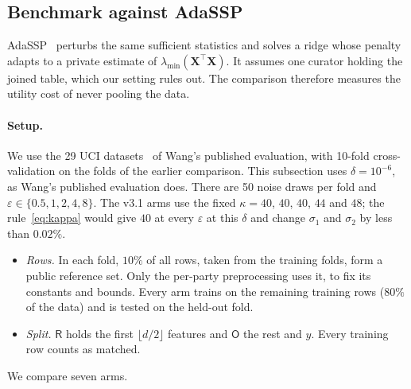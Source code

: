 \documentclass[11pt]{article}
\theoremstyle{definition}
\theoremstyle{plain}
\newcommand{\bX}{\mathbf{X}}
\newcommand{\Party}[1]{\textsf{#1}}
\newcommand{\Rp}{\Party{R}}
\newcommand{\Op}{\Party{O}}
\begin{document}
\subsection{Benchmark against AdaSSP}
\label{sec:eval:adassp}

AdaSSP~\cite{wang2018revisiting} perturbs the same sufficient statistics and solves a ridge whose penalty adapts to a private estimate of $\lambda_{\min}(\bX^{\top}\bX)$. It assumes one curator holding the joined table, which our setting rules out. The comparison therefore measures the utility cost of never pooling the data.

\paragraph{Setup.} We use the 29 UCI datasets~\cite{dua2019uci} of Wang's published evaluation, with 10-fold cross-validation on the folds of the earlier comparison. This subsection uses $\delta = 10^{-6}$, as Wang's published evaluation does. There are 50 noise draws per fold and $\varepsilon \in \{0.5, 1, 2, 4, 8\}$. The v3.1 arms use the fixed $\kappa = 40$, $40$, $40$, $44$ and $48$; the rule~\eqref{eq:kappa} would give $40$ at every $\varepsilon$ at this $\delta$ and change $\sigma_1$ and $\sigma_2$ by less than $0.02\%$.
\begin{itemize}[noitemsep]
  \item \emph{Rows.} In each fold, $10\%$ of all rows, taken from the training folds, form a public reference set. Only the per-party preprocessing uses it, to fix its constants and bounds. Every arm trains on the remaining training rows ($80\%$ of the data) and is tested on the held-out fold.
  \item \emph{Split.} $\Rp$ holds the first $\lfloor d/2 \rfloor$ features and $\Op$ the rest and $y$. Every training row counts as matched.
\end{itemize}
We compare seven arms.
\end{document}
